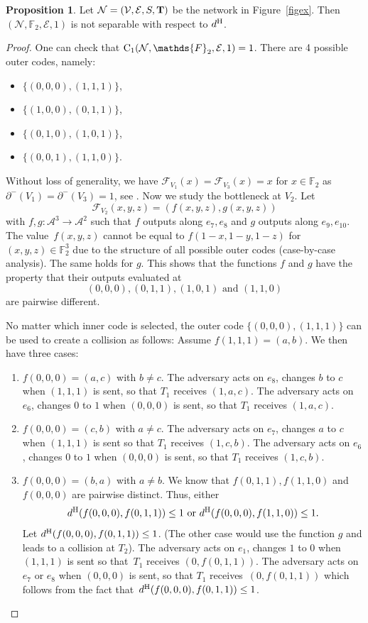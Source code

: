 \documentclass[11pt,a4paper]{article}
\theoremstyle{definition}
\newtheorem{proposition}[theorem]{Proposition}
\newcommand{\numberset}{\mathds}
\newcommand{\F}{\numberset{F}}
\newcommand{\mA}{\mathcal{A}}
\newcommand{\mN}{\mathcal{N}}
\newcommand{\mF}{\mathcal{F}}
\newcommand{\dH}{d^\textnormal{H}}
\newcommand{\mE}{\mathcal{E}}
\newcommand{\mV}{\mathcal{V}}
\newcommand{\CC}{\textnormal{C}}
\newcommand{\bfT}{\bf T}
\newcommand{\degin}{\partial^-}
\begin{document}
\begin{proposition} \label{prop:notH}
    Let $\mN=(\mV,\mE, S, \bfT)$ be the network in Figure~\ref{figex}. Then $(\mN,\F_2,\mE,1)$ is not separable with respect to $\dH$.
\end{proposition}

\begin{proof}
One can check that $\CC_1(\mN,\F_2,\mE,1) = 1$. There are 4 possible outer codes, namely:
\begin{itemize}
    \item $\{(0,0,0),(1,1,1)\}$,
    \item $\{(1,0,0),(0,1,1)\}$,
    \item $\{(0,1,0),(1,0,1)\}$,
    \item $\{(0,0,1),(1,1,0)\}$.
\end{itemize}
Without loss of generality, we have $\mF_{V_1}(x)=\mF_{V_3}(x)=x$ for $x \in \F_2$ as $\degin(V_1)=\degin(V_3)=1$, see \cite[Proposition 2]{hojny2023role}. Now we study the bottleneck at $V_2$. Let 
$$\mF_{V_2}(x,y,z) = (f(x,y,z),g(x,y,z))$$ with $f,g\colon\mA^3 \rightarrow \mA^2$ such that $f$ outputs along $e_7,e_8$ and $g$ outputs along $e_9,e_{10}$. 
The value~$f(x,y,z)$ cannot be equal to $f(1-x,1-y,1-z)$ for $(x,y,z) \in \F_2^3$ due to the structure of all possible outer codes (case-by-case analysis). The same holds for $g$. This shows that the functions $f$ and $g$ have the property that their outputs evaluated at 
$$(0,0,0), (0,1,1),(1,0,1) \mbox{ and }(1,1,0)$$ are pairwise different. 




No matter which inner code is selected, the outer code $\{(0,0,0),(1,1,1)\}$ can be used to create a collision as follows: Assume $f(1,1,1)=(a,b)$. We then have three cases:
\begin{enumerate}[label=(\roman*)]
    \item $f(0,0,0)=(a,c)$ with $b\neq c$. The adversary acts on $e_{8}$, changes $b$ to $c$ when $(1,1,1)$ is sent, so that $T_1$ receives $(1,a,c).$ The adversary acts on $e_{6}$, changes $0$ to $1$ when $(0,0,0)$ is sent, so that $T_1$ receives $(1,a,c).$
    \item $f(0,0,0)=(c,b)$ with $a\neq c$. The adversary acts on $e_{7}$, changes $a$ to $c$ when $(1,1,1)$ is sent so that $T_1$ receives $(1,c,b).$ The adversary acts on $e_{6}$, changes $0$ to $1$ when $(0,0,0)$ is sent, so that $T_1$ receives $(1,c,b).$
    \item $f(0,0,0)=(b,a)$ with $a\neq b$. We know that $f(0,1,1), f(1,1,0)$ and $f(0,0,0)$ are pairwise distinct. Thus, either $$\dH(f(0,0,0),f(0,1,1)) \le 1 \mbox{ or } \dH(f(0,0,0),f(1,1,0)) \le 1.$$ Let $\dH(f(0,0,0),f(0,1,1)) \le 1$. (The other case would use the function $g$ and leads to a collision at $T_2$). The adversary acts on $e_{1}$, changes $1$ to $0$ when $(1,1,1)$ is sent so that~$T_1$ receives $(0,f(0,1,1)).$ The adversary acts on $e_{7}$ or $e_{8}$ when $(0,0,0)$ is sent, so that $T_1$ receives~$(0,f(0,1,1))$ which follows from the fact that~$\dH(f(0,0,0),f(0,1,1)) \le 1$. \qedhere    
\end{enumerate} 
\end{proof}    
\end{document}
